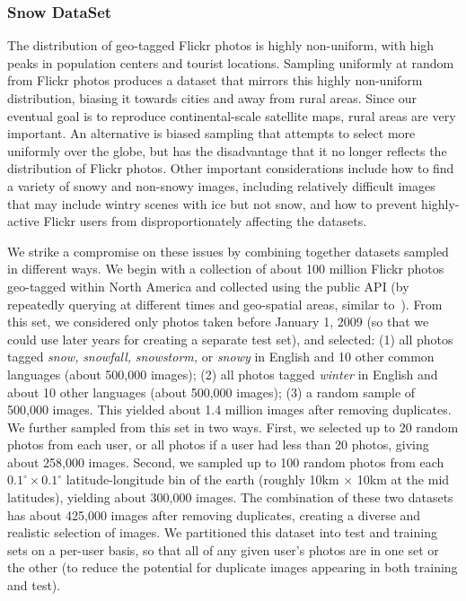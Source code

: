 \documentclass[10pt,journal,compsoc]{IEEEtran}
\begin{document}
\subsubsection{Snow DataSet}

The distribution of geo-tagged Flickr photos is highly
non-uniform, with high peaks in population centers and tourist
locations.  Sampling uniformly at random from  Flickr photos
produces a dataset that mirrors this highly non-uniform distribution,
biasing it towards cities and away from rural areas. Since our
eventual goal is to reproduce continental-scale satellite maps, rural
areas are very important. An alternative is biased sampling that
attempts to select more uniformly over the globe, but has the
disadvantage that it no longer reflects the distribution of Flickr
photos. Other important considerations include how to find a variety
of snowy and non-snowy images, including relatively difficult images
that may include wintry scenes with ice but not snow, and how to
prevent highly-active Flickr users from disproportionately affecting
the datasets.

We strike a compromise on these issues by combining together datasets
sampled in different ways.  We begin with a collection of about 100
million Flickr photos geo-tagged within North America and collected
using the public API (by repeatedly querying at different times and
geo-spatial areas, similar to~\cite{hays}). From this set, we
considered only photos taken before January 1, 2009 (so that we could
use later years for creating a separate test set), and selected:
%
(1) all photos tagged \textit{snow,} \textit{snowfall,} \textit{snowstorm,} or \textit{snowy} in
  English and 10 other common languages (about 500,000 images);
(2) all photos tagged \textit{winter} in English and about 10 other languages (about 500,000 images);
(3) a random sample of 500,000 images.
%
This yielded about 1.4 million images after removing duplicates.  We
further sampled from this set in two ways. First, we selected up to 20
random photos from each user, or all photos if a user had less than 20
photos, giving about 258,000 images. Second, we sampled up to 100
random photos from each $0.1^\circ \times 0.1^\circ$
latitude-longitude bin of the earth (roughly 10km $\times$ 10km at the
mid latitudes), yielding about 300,000 images. The combination of
these two datasets has about 425,000 images after removing duplicates,
creating 
a diverse and realistic selection
of images.  We partitioned this dataset into test and training
sets on a per-user basis, so that all of any given user's photos are
in one set or the other  (to reduce the potential
for duplicate images appearing in both
training and test).
\end{document}
